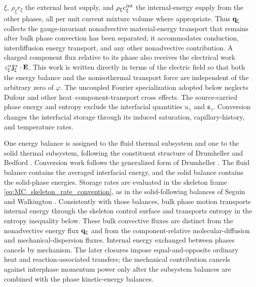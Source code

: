 \(\xi\), \(\rho_\xi r_\xi\) the external heat supply, and
\(\rho_\xi e_\xi^{\rm int}\) the internal-energy supply from the other phases,
all per unit current mixture volume where appropriate.  Thus
\(\mathbf{q}_\xi\) collects the gauge-invariant nonadvective material-energy
transport that remains after bulk phase convection has been separated; it
accommodates conduction, interdiffusion energy transport, and any other
nonadvective contribution.  A charged
component flux relative to its phase also receives the electrical work
\(z_\xi^\alpha\mathbf{j}_\xi^\alpha\cdot\mathbf{E}\).  This work is written directly
in terms of the electric field so that both the energy balance and the
nonisothermal transport force are independent of the arbitrary zero of
\(\varphi\).  The uncoupled Fourier specialization adopted below neglects
Dufour and other heat--component-transport cross effects.
The source-carried phase energy and entropy exclude the interfacial quantities
\(u_\gamma\) and \(\mathfrak{s}_\gamma\).  Conversion changes the interfacial
storage through its induced saturation, capillary-history, and temperature
rates.

One energy balance is assigned to the fluid thermal subsystem and one to the
solid thermal subsystem, following the constituent structure of Drumheller and
Bedford \cite{drumheller1980thermomechanical}.  Conversion work follows the
generalized form of Drumheller \cite[eq.~(50)]{drumheller2000}.  The fluid
balance contains the averaged interfacial energy, and the solid balance contains
the solid-phase energies.  Storage rates are evaluated in the skeleton frame
\eqref{eq:MC_skeleton_rate_convention}, as in the solid-following balances of
Seguin and Walkington \cite[eqs.~(10)--(12)]{seguin2019multicomponent}.
Consistently with those balances, bulk phase motion transports internal energy
through the skeleton control surface and transports entropy in the entropy
inequality below.  These bulk convective fluxes are distinct from the
nonadvective energy flux \(\mathbf{q}_\xi\) and from the component-relative
molecular-diffusion and mechanical-dispersion fluxes.  Internal energy exchanged
between phases cancels by mechanism.  The later closures impose
equal-and-opposite ordinary heat and reaction-associated transfers; the
mechanical contribution cancels against interphase momentum power only after
the subsystem balances are combined with the phase kinetic-energy balances.

